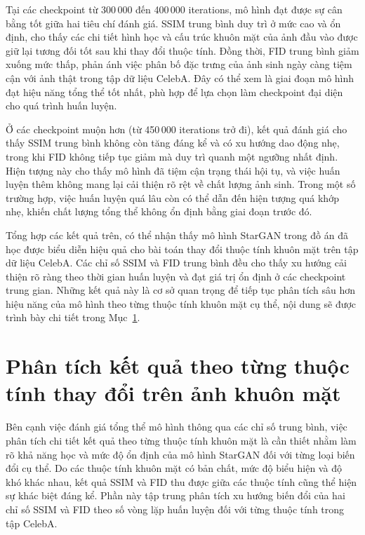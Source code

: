 \documentclass[../DoAn.tex]{subfiles}
\begin{document}
Tại các checkpoint từ 300\,000 đến 400\,000 iterations, mô hình đạt được sự cân bằng tốt giữa hai tiêu chí đánh giá. SSIM trung bình duy trì ở mức cao và ổn định, cho thấy các chi tiết hình học và cấu trúc khuôn mặt của ảnh đầu vào được giữ lại tương đối tốt sau khi thay đổi thuộc tính. Đồng thời, FID trung bình giảm xuống mức thấp, phản ánh việc phân bố đặc trưng của ảnh sinh ngày càng tiệm cận với ảnh thật trong tập dữ liệu CelebA. Đây có thể xem là giai đoạn mô hình đạt hiệu năng tổng thể tốt nhất, phù hợp để lựa chọn làm checkpoint đại diện cho quá trình huấn luyện.

Ở các checkpoint muộn hơn (từ 450\,000 iterations trở đi), kết quả đánh giá cho thấy SSIM trung bình không còn tăng đáng kể và có xu hướng dao động nhẹ, trong khi FID không tiếp tục giảm mà duy trì quanh một ngưỡng nhất định. Hiện tượng này cho thấy mô hình đã tiệm cận trạng thái hội tụ, và việc huấn luyện thêm không mang lại cải thiện rõ rệt về chất lượng ảnh sinh. Trong một số trường hợp, việc huấn luyện quá lâu còn có thể dẫn đến hiện tượng quá khớp nhẹ, khiến chất lượng tổng thể không ổn định bằng giai đoạn trước đó.

Tổng hợp các kết quả trên, có thể nhận thấy mô hình StarGAN trong đồ án đã học được biểu diễn hiệu quả cho bài toán thay đổi thuộc tính khuôn mặt trên tập dữ liệu CelebA. Các chỉ số SSIM và FID trung bình đều cho thấy xu hướng cải thiện rõ ràng theo thời gian huấn luyện và đạt giá trị ổn định ở các checkpoint trung gian. Những kết quả này là cơ sở quan trọng để tiếp tục phân tích sâu hơn hiệu năng của mô hình theo từng thuộc tính khuôn mặt cụ thể, nội dung sẽ được trình bày chi tiết trong Mục~\ref{section:5.4}.











\section{Phân tích kết quả theo từng thuộc tính thay đổi trên ảnh khuôn mặt}
\label{section:5.4}

Bên cạnh việc đánh giá tổng thể mô hình thông qua các chỉ số trung bình, việc phân tích chi tiết kết quả theo từng thuộc tính khuôn mặt là cần thiết nhằm làm rõ khả năng học và mức độ ổn định của mô hình StarGAN đối với từng loại biến đổi cụ thể. Do các thuộc tính khuôn mặt có bản chất, mức độ biểu hiện và độ khó khác nhau, kết quả SSIM và FID thu được giữa các thuộc tính cũng thể hiện sự khác biệt đáng kể. Phần này tập trung phân tích xu hướng biến đổi của hai chỉ số SSIM và FID theo số vòng lặp huấn luyện đối với từng thuộc tính trong tập CelebA.
\end{document}
